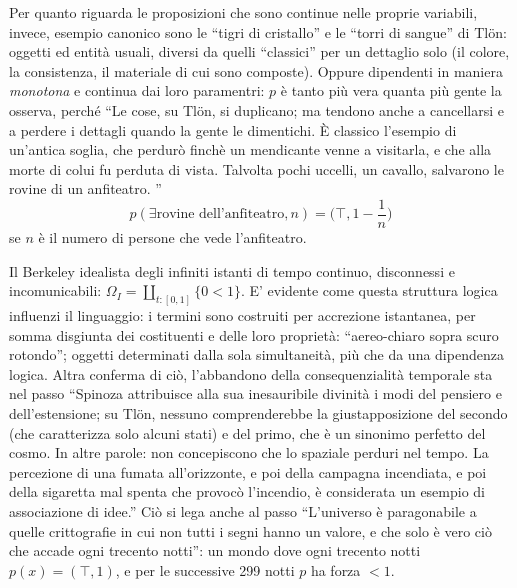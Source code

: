 \begin{example}
  Per quanto riguarda le proposizioni che sono continue nelle proprie variabili, invece, esempio canonico sono le ``tigri di cristallo'' e le ``torri di sangue'' di Tl\"{o}n: oggetti ed entità usuali, diversi da quelli ``classici'' per un dettaglio solo (il colore, la consistenza, il materiale di cui sono composte). Oppure dipendenti in maniera \emph{monotona} e continua dai loro paramentri: $p$ è tanto più vera quanta più gente la osserva, perché ``Le cose, su Tlön, si duplicano; ma tendono anche a cancellarsi e a  perdere i dettagli quando la gente le dimentichi. È classico l'esempio di  un'antica soglia, che perdurò finchè un mendicante venne a visitarla, e che alla  morte di colui fu perduta di vista. Talvolta pochi uccelli, un cavallo, salvarono le  rovine di un anfiteatro. ''
        \[\textstyle p(\exists\text{rovine dell'anfiteatro}, n) = \big(\top, 1-\frac{1}{n}\big)\]
        se $n$ è il numero di persone che vede l'anfiteatro.
\end{example}
\begin{example}
  Il Berkeley idealista degli infiniti istanti di tempo continuo, disconnessi e incomunicabili: $\Omega_I = \coprod_{t : [0,1]} \{ 0 < 1 \}$. E' evidente come questa struttura logica influenzi il linguaggio: i termini sono costruiti per accrezione istantanea, per somma disgiunta dei costituenti e delle loro proprietà: ``aereo-chiaro sopra scuro rotondo''; oggetti determinati dalla sola simultaneità, più che da una dipendenza logica. Altra conferma di ciò, l'abbandono della consequenzialità temporale sta nel passo ``Spinoza attribuisce alla sua inesauribile divinità i modi del pensiero e dell'estensione; su Tlön, nessuno comprenderebbe la giustapposizione del  secondo (che caratterizza solo alcuni stati) e del primo, che è un sinonimo  perfetto del cosmo. In altre parole: non concepiscono che lo spaziale perduri  nel tempo. La percezione di una fumata all'orizzonte, e poi della campagna  incendiata, e poi della sigaretta mal spenta che provocò l'incendio, è  considerata un esempio di associazione di idee.'' Ciò si lega anche al passo ``L'universo è paragonabile a quelle crittografie in cui non tutti i segni hanno un valore, e che solo è vero ciò che accade ogni trecento notti'': un mondo dove ogni trecento notti $p(x) =(\top,1)$, e per le successive 299 notti $p$ ha forza $<1$.
\end{example}
\begin{example}
  
\end{example}
